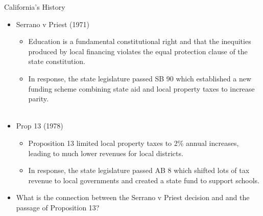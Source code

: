 \documentclass[handout]{beamer}
\begin{document}
\begin{frame}[<+->]{California's History}
	\begin{itemize}
		\item Serrano v Priest (1971)
		\begin{itemize}
			\item Education is a fundamental constitutional right and that the inequities produced by local financing violates the equal protection clause of the state constitution. 
			\item In response, the state legislature passed SB 90 which established a new funding scheme combining state aid and local property taxes to increase parity. \\~\\
		\end{itemize}
		\item Prop 13 (1978)
		\begin{itemize}
			\item Proposition 13 limited local property taxes to 2\% annual increases, leading to much lower revenues for local districts. 
			\item In response, the state legislature passed AB 8 which shifted lots of tax revenue to local governments and created a state fund to support schools. 
		\end{itemize}
		\item What is the connection between the Serrano v Priest decision and and the passage of Proposition 13?
	\end{itemize}
\end{frame}
\end{document}
